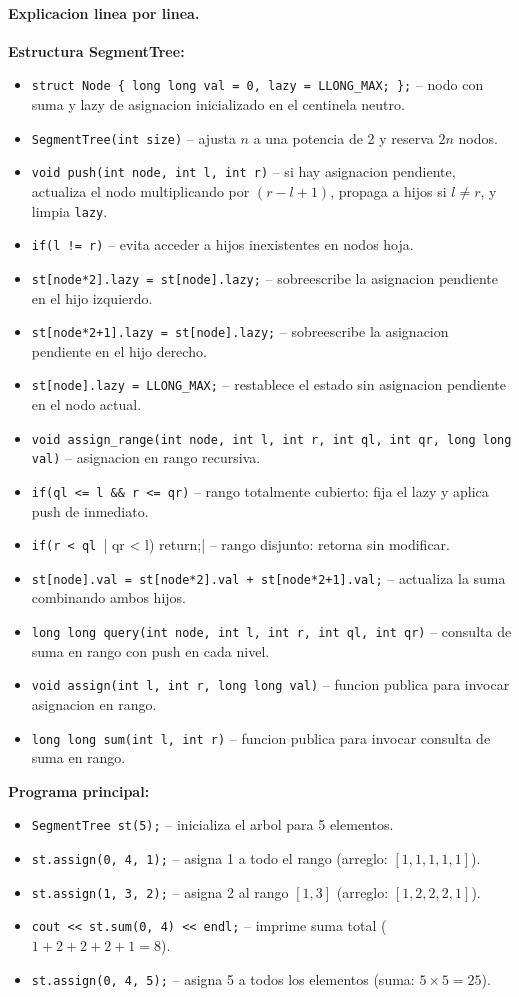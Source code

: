 \paragraph{Explicacion linea por linea.}
\textbf{Estructura SegmentTree:}
\begin{itemize}\setlength\itemsep{0pt}
	\item \verb|struct Node { long long val = 0, lazy = LLONG_MAX; };| -- nodo con suma y lazy de asignacion inicializado en el centinela neutro.
	\item \verb|SegmentTree(int size)| -- ajusta $n$ a una potencia de 2 y reserva $2n$ nodos.
	\item \verb|void push(int node, int l, int r)| -- si hay asignacion pendiente, actualiza el nodo multiplicando por $(r - l + 1)$, propaga a hijos si $l \ne r$, y limpia \texttt{lazy}.
	\item \verb|if(l != r)| -- evita acceder a hijos inexistentes en nodos hoja.
	\item \verb|st[node*2].lazy = st[node].lazy;| -- sobreescribe la asignacion pendiente en el hijo izquierdo.
	\item \verb|st[node*2+1].lazy = st[node].lazy;| -- sobreescribe la asignacion pendiente en el hijo derecho.
	\item \verb|st[node].lazy = LLONG_MAX;| -- restablece el estado sin asignacion pendiente en el nodo actual.
	\item \verb|void assign_range(int node, int l, int r, int ql, int qr, long long val)| -- asignacion en rango recursiva.
	\item \verb|if(ql <= l && r <= qr)| -- rango totalmente cubierto: fija el lazy y aplica push de inmediato.
	\item \verb|if(r < ql || qr < l) return;| -- rango disjunto: retorna sin modificar.
	\item \verb|st[node].val = st[node*2].val + st[node*2+1].val;| -- actualiza la suma combinando ambos hijos.
	\item \verb|long long query(int node, int l, int r, int ql, int qr)| -- consulta de suma en rango con push en cada nivel.
	\item \verb|void assign(int l, int r, long long val)| -- funcion publica para invocar asignacion en rango.
	\item \verb|long long sum(int l, int r)| -- funcion publica para invocar consulta de suma en rango.
\end{itemize}
\textbf{Programa principal:}
\begin{itemize}\setlength\itemsep{0pt}
	\item \verb|SegmentTree st(5);| -- inicializa el arbol para 5 elementos.
	\item \verb|st.assign(0, 4, 1);| -- asigna 1 a todo el rango (arreglo: $[1, 1, 1, 1, 1]$).
	\item \verb|st.assign(1, 3, 2);| -- asigna 2 al rango $[1, 3]$ (arreglo: $[1, 2, 2, 2, 1]$).
	\item \verb|cout << st.sum(0, 4) << endl;| -- imprime suma total ($1 + 2 + 2 + 2 + 1 = 8$).
	\item \verb|st.assign(0, 4, 5);| -- asigna 5 a todos los elementos (suma: $5 \times 5 = 25$).
\end{itemize}

